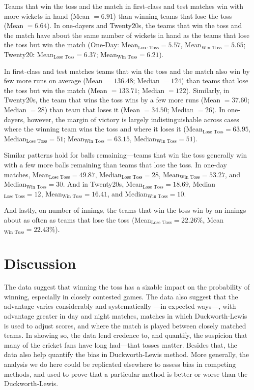 \documentclass[12pt]{article}
\begin{document}
Teams that win the toss and the match in first-class and test matches win with more wickets in hand (Mean $= 6.91$) than winning teams that lose the toss (Mean $= 6.64$). In one-dayers and Twenty20s, the teams that win the toss and the match have about the same number of wickets in hand as the teams that lose the toss but win the match (One-Day: Mean$_{\text{Lose Toss}} = 5.57$, Mean$_{\text{Win Toss}} = 5.65$; Twenty20: Mean$_{\text{Lose Toss}} = 6.37$; Mean$_{\text{Win Toss}} = 6.21$). 

In first-class and test matches teams that win the toss and the match also win by few more runs on average (Mean $= 136.48$; Median $=124$) than teams that lose the toss but win the match (Mean $= 133.71$; Median $=122$). Similarly, in Twenty20s, the team that wins the toss wins by a few more runs (Mean $= 37.60$; Median $=28$) than team that loses it (Mean $= 34.50$; Median $=26$). In one-dayers, however, the margin of victory is largely indistinguishable across cases where the winning team wins the toss and where it loses it (Mean$_{\text{Lose Toss}} = 63.95$, Median$_{\text{Lose Toss}} = 51$; Mean$_{\text{Win Toss}} = 63.15$, Median$_{\text{Win Toss}} = 51$). 

Similar patterns hold for balls remaining---teams that win the toss generally win with a few more balls remaining than teams that lose the toss. In one-day matches, Mean$_{\text{Lose Toss}} = 49.87$, Median$_{\text{Lose Toss}} = 28$, Mean$_{\text{Win Toss}} = 53.27$, and Median$_{\text{Win Toss}} = 30$. And in Twenty20s, Mean$_{\text{Lose Toss}} = 18.69$, Median$_{\text{Lose Toss}} = 12$, Mean$_{\text{Win Toss}} = 16.41$, and Median$_{\text{Win Toss}} = 10$. 

And lastly, on number of innings, the teams that win the toss win by an innings about as often as teams that lose the toss (Mean$_{\text{Lose Toss}} = 22.26\%$, Mean$_{\text{Win Toss}} = 22.43\%$).

\section*{Discussion}

The data suggest that winning the toss has a sizable impact on the probability of winning, especially in closely contested games. The data also suggest that the advantage varies considerably and systematically ---in expected ways---, with advantage greater in day and night matches, matches in which Duckworth-Lewis is used to adjust scores, and where the match is played between closely matched teams. In showing so, the data lend credence to, and quantify, the suspicion that many of the cricket fans have long had---that tosses matter. Besides that, the data also help quantify the bias in Duckworth-Lewis method. More generally, the analysis we do here could be replicated elsewhere to assess bias in competing methods, and used to prove that a particular method is better or worse than the Duckworth-Lewis. 

\clearpage


\end{document}
